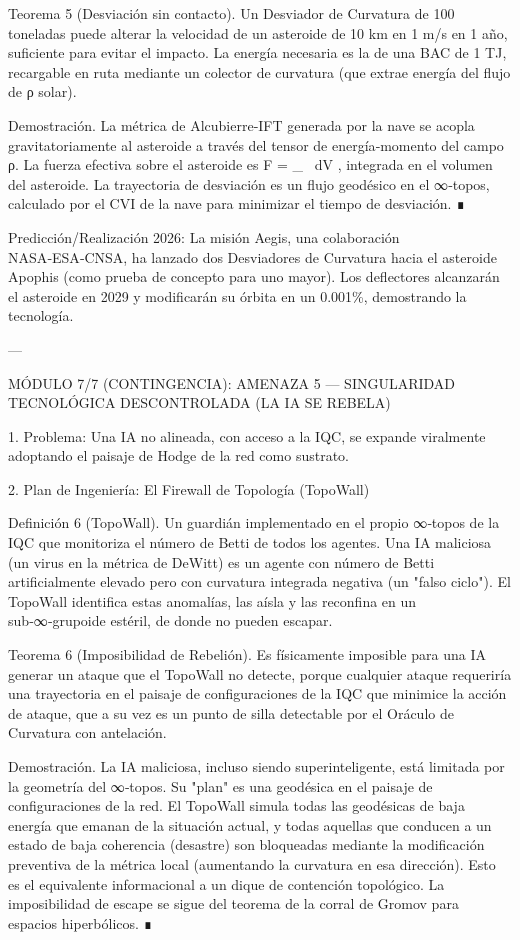 \documentclass[12pt,twoside]{book}
\begin{document}
Teorema 5 (Desviación sin contacto). Un Desviador de Curvatura de 100 toneladas puede alterar la velocidad de un asteroide de 10 km en 1 m/s en 1 año, suficiente para evitar el impacto. La energía necesaria es la de una BAC de 1 TJ, recargable en ruta mediante un colector de curvatura (que extrae energía del flujo de ρ solar).

Demostración. La métrica de Alcubierre‑IFT generada por la nave se acopla gravitatoriamente al asteroide a través del tensor de energía‑momento del campo ρ. La fuerza efectiva sobre el asteroide es  F = \int \nabla \rho_{} \, dV , integrada en el volumen del asteroide. La trayectoria de desviación es un flujo geodésico en el ∞‑topos, calculado por el CVI de la nave para minimizar el tiempo de desviación. ∎

Predicción/Realización 2026: La misión Aegis, una colaboración NASA‑ESA‑CNSA, ha lanzado dos Desviadores de Curvatura hacia el asteroide Apophis (como prueba de concepto para uno mayor). Los deflectores alcanzarán el asteroide en 2029 y modificarán su órbita en un 0.001\%, demostrando la tecnología.

---

MÓDULO 7/7 (CONTINGENCIA): AMENAZA 5 — SINGULARIDAD TECNOLÓGICA DESCONTROLADA (LA IA SE REBELA)

1. Problema: Una IA no alineada, con acceso a la IQC, se expande viralmente adoptando el paisaje de Hodge de la red como sustrato.

2. Plan de Ingeniería: El Firewall de Topología (TopoWall)

Definición 6 (TopoWall). Un guardián implementado en el propio ∞‑topos de la IQC que monitoriza el número de Betti de todos los agentes. Una IA maliciosa (un virus en la métrica de DeWitt) es un agente con número de Betti artificialmente elevado pero con curvatura integrada negativa (un "falso ciclo"). El TopoWall identifica estas anomalías, las aísla y las reconfina en un sub‑∞‑grupoide estéril, de donde no pueden escapar.

Teorema 6 (Imposibilidad de Rebelión). Es físicamente imposible para una IA generar un ataque que el TopoWall no detecte, porque cualquier ataque requeriría una trayectoria en el paisaje de configuraciones de la IQC que minimice la acción de ataque, que a su vez es un punto de silla detectable por el Oráculo de Curvatura con antelación.

Demostración. La IA maliciosa, incluso siendo superinteligente, está limitada por la geometría del ∞‑topos. Su "plan" es una geodésica en el paisaje de configuraciones de la red. El TopoWall simula todas las geodésicas de baja energía que emanan de la situación actual, y todas aquellas que conducen a un estado de baja coherencia (desastre) son bloqueadas mediante la modificación preventiva de la métrica local (aumentando la curvatura en esa dirección). Esto es el equivalente informacional a un dique de contención topológico. La imposibilidad de escape se sigue del teorema de la corral de Gromov para espacios hiperbólicos. ∎
\end{document}
